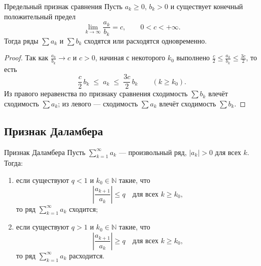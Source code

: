 \begin{Theorem}{Предельный признак сравнения}{}
	Пусть $a_k \ge 0$, $b_k > 0$ и существует конечный положительный предел
	\[
	\lim_{k\to\infty} \frac{a_k}{b_k} = c, \qquad 0 < c < +\infty.
	\]
	Тогда ряды $\sum a_k$ и $\sum b_k$ сходятся или расходятся одновременно.
\end{Theorem}

\begin{proof}
	Так как $\frac{a_k}{b_k} \to c$ и $c > 0$, начиная с некоторого $k_0$
	выполнено $\frac{c}{2} \le \frac{a_k}{b_k} \le \frac{3c}{2}$, то есть
	\[
	\frac{c}{2}\,b_k \;\le\; a_k \;\le\; \frac{3c}{2}\,b_k \qquad (k \ge k_0).
	\]
	Из правого неравенства по признаку сравнения сходимость $\sum b_k$ влечёт
	сходимость $\sum a_k$; из левого --- сходимость $\sum a_k$ влечёт
	сходимость $\sum b_k$.
\end{proof}

\subsection*{Признак Даламбера}

\begin{Theorem}{Признак Даламбера}{}
	Пусть $\sum_{k=1}^{\infty} a_k$ --- произвольный ряд, $|a_k| > 0$ для
	всех $k$. Тогда:
	\begin{enumerate}
		\item если существуют $q < 1$ и $k_0 \in \mathbb{N}$ такие, что
		\[
		\left|\frac{a_{k+1}}{a_k}\right| \le q
		\quad \text{для всех } k \ge k_0,
		\]
		то ряд $\sum_{k=1}^{\infty} a_k$ сходится;
		\item если существуют $q > 1$ и $k_0 \in \mathbb{N}$ такие, что
		\[
		\left|\frac{a_{k+1}}{a_k}\right| \ge q
		\quad \text{для всех } k \ge k_0,
		\]
		то ряд $\sum_{k=1}^{\infty} a_k$ расходится.
	\end{enumerate}
\end{Theorem}

